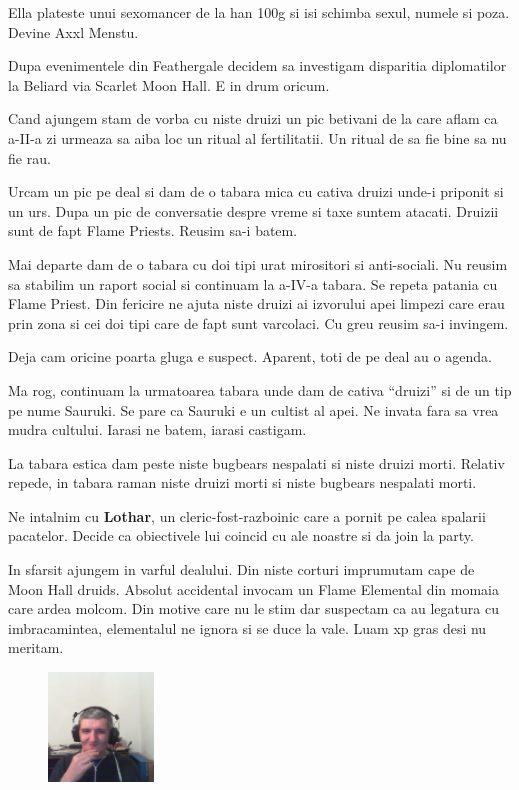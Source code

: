 \documentclass[12pt,oneside]{book}
\begin{document}
Ella plateste unui sexomancer de la han 100g si isi schimba sexul, numele 
si poza. Devine Axxl Menstu.

Dupa evenimentele din Feathergale decidem sa investigam disparitia diplomatilor 
la Beliard  via Scarlet Moon Hall. E in drum oricum. 

Cand ajungem stam de vorba cu niste druizi un pic betivani de la care aflam 
ca a-II-a zi urmeaza sa aiba loc un ritual al fertilitatii. Un ritual de 
sa fie bine sa nu fie rau. 

Urcam un pic pe deal si dam de o tabara mica cu cativa druizi unde-i priponit 
si un urs. Dupa un pic de conversatie despre vreme si taxe suntem atacati. 
Druizii sunt de fapt Flame Priests. Reusim sa-i batem.

Mai departe dam de o tabara cu doi tipi urat mirositori si anti-sociali. Nu 
reusim sa stabilim un raport social si continuam la a-IV-a tabara. Se repeta 
patania cu Flame Priest. Din fericire ne ajuta niste druizi ai izvorului apei 
limpezi care erau prin zona si cei doi tipi care de fapt sunt varcolaci. Cu 
greu reusim sa-i invingem. 

Deja cam oricine poarta gluga e suspect. Aparent, toti de pe deal au o agenda.

Ma rog, continuam la urmatoarea tabara unde dam de cativa ``druizi'' si de un 
tip pe nume Sauruki.  Se pare ca Sauruki e un cultist al apei. Ne invata fara 
sa vrea mudra cultului. Iarasi ne batem, iarasi castigam.

La tabara estica dam peste niste bugbears nespalati si niste druizi morti. 
Relativ repede, in tabara raman niste druizi morti si niste bugbears nespalati 
morti.

Ne intalnim cu \textbf{Lothar}, un cleric-fost-razboinic care a pornit pe 
calea spalarii pacatelor. Decide ca obiectivele lui coincid cu ale noastre 
si da join la party.

In sfarsit ajungem in varful dealului. Din niste corturi imprumutam cape 
de Moon Hall druids. Absolut accidental invocam un Flame Elemental din 
momaia care ardea molcom. Din motive care nu le stim dar suspectam ca 
au legatura cu imbracamintea, elementalul ne ignora si se duce la vale.
Luam xp gras desi nu meritam.

\begin{figure}
    \centering
    \includegraphics[width=0.25\textwidth]{images/dm-smiles}
\end{figure}
\end{document}
